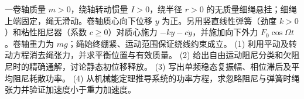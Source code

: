 一卷轴质量 \(m>0\)，绕轴转动惯量 \(I>0\)，绕半径 \(r>0\) 的无质量细绳悬挂；细绳上端固定，绳无滑动。卷轴质心向下位移 \(y\) 为正。另用竖直线性弹簧（劲度 \(k>0\)）和粘性阻尼器（系数 \(c\ge0\)）对质心施力 \(-ky-c\dot y\)，并施加向下外力 \(F_0\cos\Omega t\)。卷轴重力为 \(mg\)；绳始终绷紧、运动范围保证绕线约束成立。
(1) 利用平动及转动方程消去绳张力，并求平衡位置与有效质量。
(2) 给出自由运动阻尼分类和欠阻尼时的精确通解，讨论静态初位移释放。
(3) 写出单频稳态复振幅、相位滞后及平均阻尼耗散功率。
(4) 从机械能定理推导系统的功率方程，求忽略阻尼与弹簧时绳张力并验证加速度小于重力加速度。
